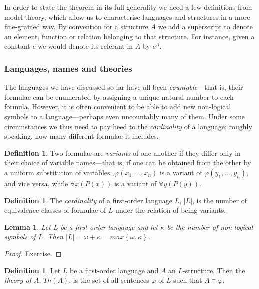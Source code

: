 \documentclass[10pt, a4paper, oneside]{article}
\theoremstyle{definition}
\newtheorem{dfn}[thm]{Definition}
\theoremstyle{remark}
\theoremstyle{plain}
\newtheorem{lem}[thm]{Lemma}
\theoremstyle{plain}
\begin{document}
In order to state the theorem in its full generality we need a few definitions
from model theory, which allow us to characterise languages and structures in a
more fine-grained way. By convention for a structure $A$ we add a superscript to
denote an element, function or relation belonging to that structure. For
instance, given a constant $c$ we would denote its referant in $A$ by $c^A$.

\subsubsection{Languages, names and theories}

The languages we have discussed so far have all been \emph{countable}---that is,
their formulae can be enumerated by assigning a unique natural number to each
formula. However, it is often convenient to be able to add new non-logical
symbols to a language---perhaps even uncountably many of them. Under some
circumstances we thus need to pay heed to the \emph{cardinality} of a language:
roughly speaking, how many different formulae it includes.

\begin{dfn}
    Two formulae are \emph{variants} of one another if they differ only in their
    choice of variable names---that is, if one can be obtained from the other by
    a uniform substitution of variables. $\varphi(x_1, \dotsc, x_n)$ is a
    variant of $\varphi(y_1, \dotsc, y_n)$, and vice versa, while
    $\forall{x} (P(x))$ is a variant of $\forall{y} (P(y))$.
\end{dfn}

\begin{dfn}
    The \emph{cardinality} of a first-order language $L$, $|L|$, is the number
    of equivalence classes of formulae of $L$ under the relation of being
    variants.
\end{dfn}

\begin{lem}
    Let $L$ be a first-order langauge and let $\kappa$ be the number of
    non-logical symbols of $L$. Then $|L| = \omega + \kappa =
    max \left\{ \omega, \kappa \right\}$.
\end{lem}

\begin{proof}
    Exercise.
\end{proof}

\begin{dfn}
    Let $L$ be a first-order language and $A$ an $L$-structure. Then the
    \emph{theory of $A$}, $Th(A)$, is the set of all sentences $\varphi$ of $L$
    such that $A \models \varphi$.
\end{dfn}
\end{document}
